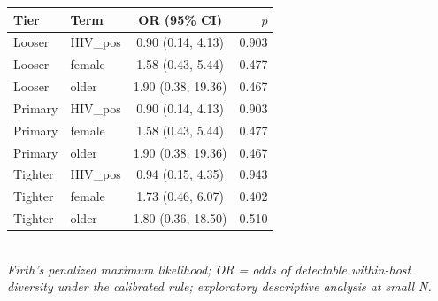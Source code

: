 \begin{tabular}{llcr}
\hline
Tier & Term & OR (95\% CI) & $p$ \\
\hline
Looser & HIV_pos & 0.90 (0.14, 4.13) & 0.903 \\
Looser & female & 1.58 (0.43, 5.44) & 0.477 \\
Looser & older & 1.90 (0.38, 19.36) & 0.467 \\
Primary & HIV_pos & 0.90 (0.14, 4.13) & 0.903 \\
Primary & female & 1.58 (0.43, 5.44) & 0.477 \\
Primary & older & 1.90 (0.38, 19.36) & 0.467 \\
Tighter & HIV_pos & 0.94 (0.15, 4.35) & 0.943 \\
Tighter & female & 1.73 (0.46, 6.07) & 0.402 \\
Tighter & older & 1.80 (0.36, 18.50) & 0.510 \\
\hline
\end{tabular}
\\\footnotesize\textit{Firth's penalized maximum likelihood;
OR = odds of detectable within-host diversity under the calibrated rule;
exploratory descriptive analysis at small N.}
